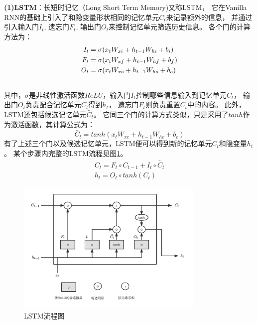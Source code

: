       \textbf{(1)LSTM}：长短时记忆（Long Short Term Memory)又称LSTM，
    它在Vanilla RNN的基础上引入了和隐变量形状相同的记忆单元$C_t$来记录额外的信息，
    并通过引入输入门$I_t$, 遗忘门$F_t$, 输出门$O_t$来控制记忆单元筛选历史信息。
    各个门的计算方法为：
    \begin{align}
      I_t &= \sigma(x_t W_{xi} + h_{t-1}W_{hi} + b_i)  \\
      F_t &= \sigma(x_t W_{xf} + h_{t-1}W_{hf} + b_f)  \\
      O_t &= \sigma(x_t W_{xo} + h_{t-1}W_{ho} + b_o)  \\
      \notag
    \end{align} 
    其中，$\sigma$是非线性激活函数$ReLU$，输入门$I_t$控制哪些信息输入到记忆单元$C_t$，
    输出门$O_t$负责配合记忆单元$C_t$得到$h_t$，
    遗忘门$F_t$则负责重置$C_t$中的内容。
    此外，LSTM还包括候选记忆单元$\tilde{C_t}$。
    它同三个门的计算方式类似，只是采用了$tanh$作为激活函数，其计算公式为：
    \begin{equation}
      \tilde{C_t} = tanh(x_t W_{xc} + h_{t-1} W_{hc} + b_c)
    \end{equation}
    有了上述三个门以及候选记忆单元，LSTM便可以得到新的记忆单元$C_t$和隐变量$h_t$。
    某个步骤内完整的LSTM流程见图\ref{pic:LSTM}。
    \begin{align}
      C_t = F_t\circ C_{t-1} + I_t \circ \tilde{C_t} \\
      h_t = O_t \circ tanh(C_t)
    \end{align}
      \begin{figure}[htbp]
        \centering
        \includegraphics[width=0.8\textwidth]{Figures/LSTM.png}
        \caption{LSTM流程图}
        \label{pic:LSTM}
      \end{figure}

